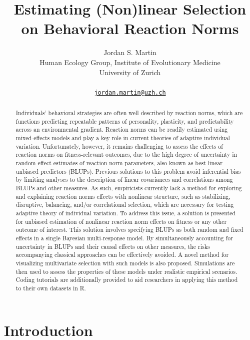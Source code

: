 \documentclass{article}
\title{Estimating (Non)linear Selection on \linebreak Behavioral
Reaction Norms}
\author{
    Jordan S. Martin
   \\
    Human Ecology Group, Institute of Evolutionary Medicine \\
    University of Zurich \\
   \\
  \texttt{\href{mailto:jordan.martin@uzh.ch}{\nolinkurl{jordan.martin@uzh.ch}}} \\
  }
\begin{document}
\maketitle

\def\tightlist{}


\begin{abstract}
Individuals' behavioral strategies are often well described by reaction
norms, which are functions predicting repeatable patterns of
personality, plasticity, and predictability across an environmental
gradient. Reaction norms can be readily estimated using mixed-effects
models and play a key role in current theories of adaptive individual
variation. Unfortunately, however, it remains challenging to assess the
effects of reaction norms on fitness-relevant outcomes, due to the high
degree of uncertainty in random effect estimates of reaction norm
parameters, also known as best linear unbiased predictors (BLUPs).
Previous solutions to this problem avoid inferential bias by limiting
analyses to the description of linear covariances and correlations among
BLUPs and other measures. As such, empiricists currently lack a method
for exploring and explaining reaction norms effects with nonlinear
structure, such as stabilizing, disruptive, balancing, and/or
correlational selection, which are necessary for testing adaptive theory
of individual variation. To address this issue, a solution is presented
for unbiased estimation of nonlinear reaction norm effects on fitness or
any other outcome of interest. This solution involves specifying BLUPs
as both random and fixed effects in a single Bayesian multi-response
model. By simultaneously accounting for uncertainty in BLUPs and their
causal effects on other measures, the risks accompanying classical
approaches can be effectively avoided. A novel method for visualizing
multivariate selection with such models is also proposed. Simulations
are then used to assess the properties of these models under realistic
empirical scenarios. Coding tutorials are additionally provided to aid
researchers in applying this method to their own datasets in R.
\end{abstract}


\hypertarget{introduction}{%
\section{Introduction}\label{introduction}}
\end{document}
